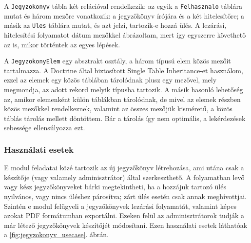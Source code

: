 \documentclass[a4paper,12pt,oneside]{report}
\begin{document}
A {\tt Jegyzokonyv} tábla két relációval rendelkezik: az egyik a {\tt Felhasznalo} táblára mutat és három mezőre vonatkozik: a jegyzőkönyv írójára és a két hitelesítőre; a másik az {\tt Ules} táblára mutat, és azt jelzi, tartozik-e hozzá ülés. A lezárási, hitelesítési folyamatot dátum mezőkkel ábrázoltam, mert így egyszerre követhető az is, mikor történtek az egyes lépések.

A {\tt JegyzokonyElem} egy absztrakt osztály, a három típusú elem közös mezőit tartalmazza. A Doctrine által biztosított Single Table Inheritance-et használom, ezzel az elemek egy közös táblában tárolódnak plusz egy mezővel, mely megmondja, az adott rekord melyik típusba tartozik. A másik hasonló lehetőség az, amikor elemenként külön táblákban tárolódnak, de mivel az elemek részben közös mezőkkel rendelkeznek, valamint az összes mezőjük kisméretű, a közös táblás tárolás mellett döntöttem. Bár a tárolás így nem optimális, a lekérdezések sebessége ellensúlyozza ezt.

\subsubsection*{Használati esetek}

E modul feladatai közé tartozik az új jegyzőkönyv létrehozása, ami utána csak a készítője (vagy valamely adminisztrátor) által szerkeszthető. A folyamatban levő vagy kész jegyzőkönyveket bárki megtekintheti, ha a hozzájuk tartozó ülés nyilvános, vagy nincs üléshez párosítva; zárt ülés esetén csak annak meghívottjai. Szintén e modul felügyeli a jegyzőkönyvek lezárási folyamatát, valamint képes azokat PDF formátumban exportálni. Ezeken felül az adminisztrátorok tudják a már létező jegyzőkönyvek készítőjét módosítani. Ezen használati esetek láthatóak a \ref{fig:jegyzokonyv_usecase}. ábrán.
\end{document}
